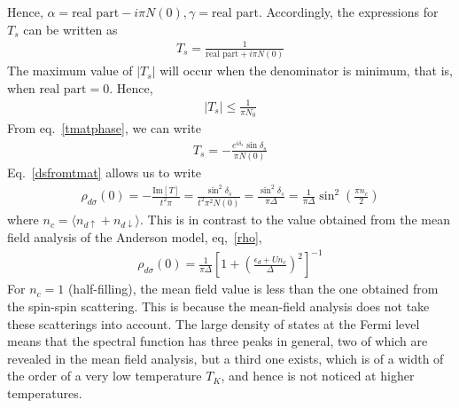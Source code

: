 \documentclass[twoside,11pt]{report}
\numberwithin{equation}{section}
\begin{document}
Hence, \(\alpha = \text{real part} - i\pi N(0), \gamma =\text{real part}\).
Accordingly, the expressions for \(T_s\) can be written as
\begin{equation}\begin{aligned}
T_s = \frac{1}{\text{real part} + i \pi N(0)}
\end{aligned}\end{equation}
The maximum value of \(|T_s|\) will occur when the denominator is minimum, that is, when \(\text{real part} = 0\).
Hence,
\begin{equation}\begin{aligned}
|T_s| \leq \frac{1}{\pi N_0}
\end{aligned}\end{equation}
From eq.~\ref{tmatphase}, we can write
\begin{equation}\begin{aligned}
T_s = -\frac{e^{i \delta_s}\sin \delta_s}{\pi N(0)}
\end{aligned}\end{equation}
Eq.~\ref{dsfromtmat} allows us to write
\begin{equation}\begin{aligned}
	\rho_{d\sigma}(0) = -\frac{\text{Im}[T]}{t^2 \pi} = \frac{\sin^2 \delta_s}{t^2 \pi^2 N(0)} = \frac{\sin^2 \delta_s}{\pi \Delta} = \frac{1}{\pi \Delta}\sin^2 \left(\frac{\pi n_c}{2}\right)
\end{aligned}\end{equation}
where \(n_c = \langle  n_{d\uparrow}+n_{d\downarrow}\rangle\).
This is in contrast to the value obtained from the mean field analysis of the Anderson model, eq,~\ref{rho},
\begin{equation}\begin{aligned}
	\rho_{d\sigma}(0) = \frac{1}{\pi \Delta}\left[1 + \left(\frac{\epsilon_d + Un_c}{\Delta}\right)^{2}\right]^{-1}
\end{aligned}\end{equation}
For \(n_c =1\) (half-filling), the mean field value is less than the one obtained from the spin-spin scattering.
This is because the mean-field analysis does not take these scatterings into account.
The large density of states at the Fermi level means that the spectral function has three peaks in general, two of which are revealed in the mean field analysis, but a third one exists, which is of a width of the order of a very low temperature \(T_K\), and hence is not noticed at higher temperatures.\\\\
\end{document}
